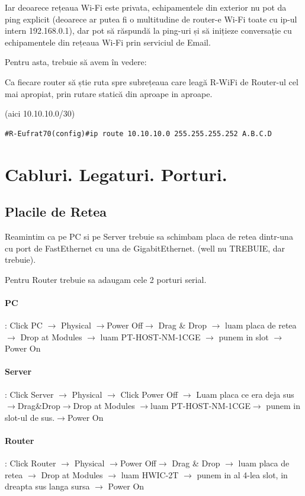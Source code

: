 \documentclass{article}
\begin{document}
Iar deoarece rețeaua Wi-Fi este privata, echipamentele din exterior nu pot da ping explicit (deoarece ar putea fi o multitudine de router-e Wi-Fi toate cu ip-ul intern 192.168.0.1), dar pot să răspundă la ping-uri și să inițieze conversație cu echipamentele din rețeaua Wi-Fi prin serviciul de Email.


Pentru asta, trebuie să avem în vedere:

 Ca fiecare router să știe ruta spre subrețeaua care leagă R-WiFi de Router-ul cel mai apropiat, prin rutare statică din aproape in aproape.
    
(aici 10.10.10.0/30)

\begin{verbatim}
#R-Eufrat70(config)#ip route 10.10.10.0 255.255.255.252 A.B.C.D
\end{verbatim}



\section{Cabluri. Legaturi. Porturi.}
\subsection{Placile de Retea}
Reamintim ca pe PC si pe Server trebuie sa schimbam placa de retea dintr-una cu port de FastEthernet cu una de GigabitEthernet. (well nu TREBUIE, dar trebuie).

Pentru Router trebuie sa adaugam cele 2 porturi serial.

\paragraph{PC}:
Click PC $\rightarrow$ Physical $\rightarrow$Power Off$\rightarrow$ Drag \& Drop $\rightarrow$ luam placa de retea $\rightarrow$ Drop at Modules $\rightarrow$ luam PT-HOST-NM-1CGE $\rightarrow$ punem in slot $\rightarrow$ Power On

\paragraph{Server}:
Click Server $\rightarrow$ Physical $\rightarrow$ Click Power Off $\rightarrow$ Luam placa ce era deja sus$\rightarrow$Drag\&Drop$\rightarrow$Drop at Modules $\rightarrow$luam PT-HOST-NM-1CGE$\rightarrow$ punem in slot-ul de sus.$\rightarrow$Power On

\paragraph{Router}:
Click Router $\rightarrow$ Physical $\rightarrow$Power Off$\rightarrow$ Drag \& Drop $\rightarrow$ luam placa de retea $\rightarrow$ Drop at Modules $\rightarrow$ luam HWIC-2T $\rightarrow$ punem in al 4-lea slot, in dreapta sus langa sursa $\rightarrow$ Power On
\end{document}
